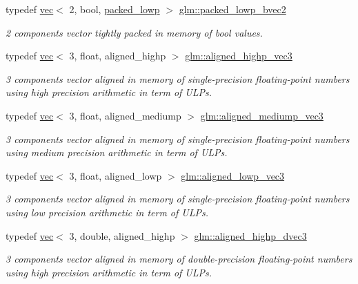 \begin{DoxyCompactItemize}
typedef \mbox{\hyperlink{structglm_1_1vec}{vec}}$<$ 2, bool, \mbox{\hyperlink{namespaceglm_a36ed105b07c7746804d7fdc7cc90ff25ac36a4bd74559be2c0b65bc48e5953b8b}{packed\+\_\+lowp}} $>$ \mbox{\hyperlink{group__gtc__type__aligned_gac3a7ad6d846a92b3e5d708cbb51b1f24}{glm\+::packed\+\_\+lowp\+\_\+bvec2}}
\begin{DoxyCompactList}\small\item\em 2 components vector tightly packed in memory of bool values. \end{DoxyCompactList}\item 
typedef \mbox{\hyperlink{structglm_1_1vec}{vec}}$<$ 3, float, aligned\+\_\+highp $>$ \mbox{\hyperlink{group__gtc__type__aligned_ga9ddb18aa4936b5aa354fcefe179675af}{glm\+::aligned\+\_\+highp\+\_\+vec3}}
\begin{DoxyCompactList}\small\item\em 3 components vector aligned in memory of single-\/precision floating-\/point numbers using high precision arithmetic in term of U\+L\+Ps. \end{DoxyCompactList}\item 
typedef \mbox{\hyperlink{structglm_1_1vec}{vec}}$<$ 3, float, aligned\+\_\+mediump $>$ \mbox{\hyperlink{group__gtc__type__aligned_ga1c5c37a497fa004afa060bd173b20447}{glm\+::aligned\+\_\+mediump\+\_\+vec3}}
\begin{DoxyCompactList}\small\item\em 3 components vector aligned in memory of single-\/precision floating-\/point numbers using medium precision arithmetic in term of U\+L\+Ps. \end{DoxyCompactList}\item 
typedef \mbox{\hyperlink{structglm_1_1vec}{vec}}$<$ 3, float, aligned\+\_\+lowp $>$ \mbox{\hyperlink{group__gtc__type__aligned_ga74eb3cf8a9ff6234da5d26f9203e179d}{glm\+::aligned\+\_\+lowp\+\_\+vec3}}
\begin{DoxyCompactList}\small\item\em 3 components vector aligned in memory of single-\/precision floating-\/point numbers using low precision arithmetic in term of U\+L\+Ps. \end{DoxyCompactList}\item 
typedef \mbox{\hyperlink{structglm_1_1vec}{vec}}$<$ 3, double, aligned\+\_\+highp $>$ \mbox{\hyperlink{group__gtc__type__aligned_gafb21f8db25007665c2cb2a9b250471aa}{glm\+::aligned\+\_\+highp\+\_\+dvec3}}
\begin{DoxyCompactList}\small\item\em 3 components vector aligned in memory of double-\/precision floating-\/point numbers using high precision arithmetic in term of U\+L\+Ps. \end{DoxyCompactList}\item 

\end{DoxyCompactItemize}
